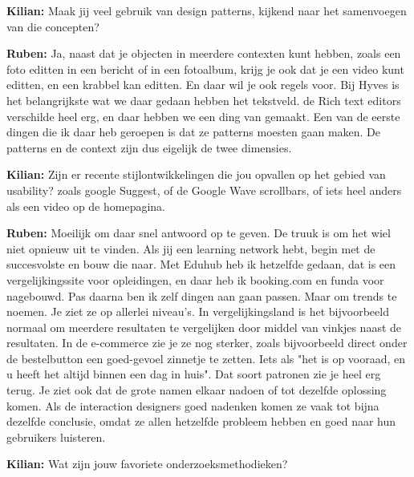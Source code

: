 \textbf{Kilian:} Maak jij veel gebruik van design patterns, kijkend naar het samenvoegen van die concepten?

\textbf{Ruben:} Ja, naast dat je objecten in meerdere contexten kunt hebben, zoals een foto editten in een bericht of in een fotoalbum, krijg je ook dat je een video kunt editten, en een krabbel kan editten. En daar wil je ook regels voor. Bij Hyves is het belangrijkste wat we daar gedaan hebben het tekstveld. de Rich text editors verschilde heel erg, en daar hebben we een ding van gemaakt. Een van de eerste dingen die ik daar heb geroepen is dat ze patterns moesten gaan maken. De patterns en de context zijn dus eigelijk de twee dimensies.

\textbf{Kilian:} Zijn er recente stijlontwikkelingen die jou opvallen op het gebied van usability? zoals google Suggest, of de Google Wave scrollbars, of iets heel anders als een video op de homepagina.

\textbf{Ruben:} Moeilijk om daar snel antwoord op te geven. De truuk is om het wiel niet opnieuw uit te vinden. Als jij een learning network hebt, begin met de succesvolste en bouw die naar. Met Eduhub heb ik hetzelfde gedaan, dat is een vergelijkingssite voor opleidingen, en daar heb ik booking.com en funda voor nagebouwd. Pas daarna ben ik zelf dingen aan gaan passen. Maar om trends te noemen. Je ziet ze op allerlei niveau's. In vergelijkingsland is het bijvoorbeeld normaal om meerdere resultaten te vergelijken door middel van vinkjes naast de resultaten. In de e-commerce zie je ze nog sterker, zoals bijvoorbeeld direct onder de bestelbutton een goed-gevoel zinnetje te zetten. Iets als "het is op vooraad, en u heeft het altijd binnen een dag in huis". Dat soort patronen zie je heel erg terug. Je ziet ook dat de grote namen elkaar nadoen of tot dezelfde oplossing komen. Als de interaction designers goed nadenken komen ze vaak tot bijna dezelfde conclusie, omdat ze allen hetzelfde probleem hebben en goed naar hun gebruikers luisteren.

\textbf{Kilian:} Wat zijn jouw favoriete onderzoeksmethodieken?

